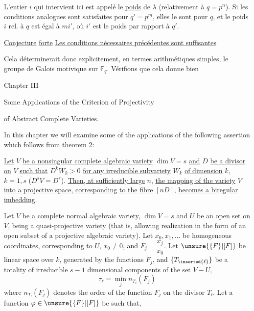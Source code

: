 L'entier $i$ qui intervient ici est appelé le \uline{poids} de $\lambda$ (relativement à $q=p^n$).  Si les conditions  analogues sont satisfaites pour $q'=p^m$, elles le sont pour $q$, et le poids $i$ rel. à $q$ est égal à $mi'$, où $i'$ est le poids par rapport à $q'$.



\uline{Conjecture}  \uline{forte} \uline{Les conditions nécessaires précédentes sont suffisantes}

Cela déterminerait donc explicitement, en termes arithmétiques simples, le groupe de Galois motivique  sur $\mathbb F_q$. Vérifions que cela donne bien



\begin{center}
Chapter III

Some Applications of the Criterion of Projectivity

of Abstract Complete Varieties.
\end{center}

In this chapter we will examine some of the applications of the following assertion which follows from theorem 2:

\uline{Let} $V$ \uline{be a nonsingular complete algebraic variety} $\dim V=s$ \uline{and} $D$ \uline{be a divisor on} $V$ \uline{such that} $D^kW_k>0$ \uline{for any irreducible subvariety} $W_k$ \uline{of dimension} $k$, $k=\overline{1,s}$ ($D^sV=D^s$). \uline{Then, at sufficiently large} $n$, \uline{the mapping of the variety} $V$ \uline{into a projective space, corresponding to the fibre} $[nD]$, \uline{becomes a biregular imbedding}.

Let $V$ be a complete normal algebraic variety, $\dim V=s$ and $U$ be an open set on $V$, being a quasi-projective variety (that is, allowing realization in the form of an open subset of a projective algebraic variety).
Let $x_0,x_1,\ldots$ be homogeneous coordinates, corresponding to $U$, $x_0\ne0$, and $F_j=\dfrac{x_j}{x_0}$. Let $\unsure{\{F\}|[F]}$ be  linear space over $k$, generated by the functions $F_j$, and $\{T_{\inserted{\ell}}\}$ be a totality of irreducible $s-1$ dimensional components of the set $V-U$,
\margin{$\ell$}
\[
\tau_\ell=\min_j n_{T_\ell}(F_j)
\]
where $n_{T_l}(F_j)$ denotes the order of the function $F_j$ on the divisor $T_l$. Let a function $\varphi\in\unsure{\{F\}|[F]}$ be such that,

